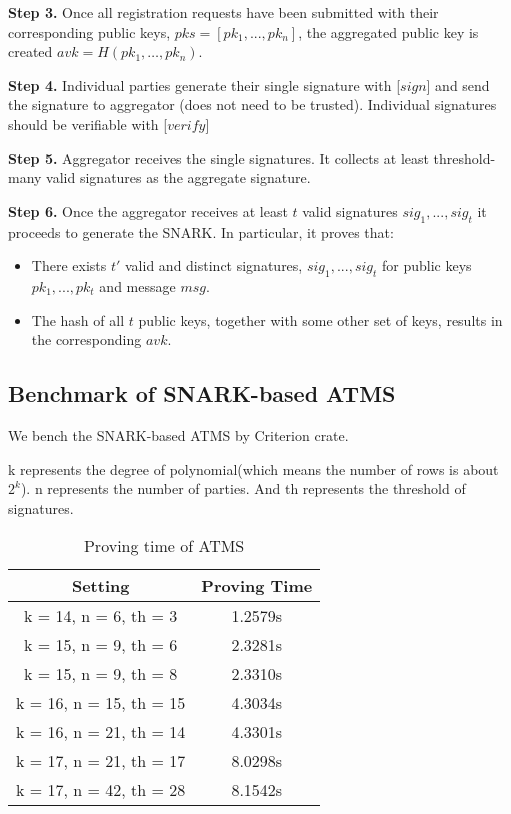 \documentclass{article}
\begin{document}
  
\textbf{Step 3.} Once all registration requests have been submitted with their corresponding public keys, $pks = [pk_1, ..., pk_n]$, the aggregated public key is created $avk = H(pk_1, \ldots, pk_n)$.

\textbf{Step 4.} Individual parties generate their single signature with [$sign$] and send the signature to aggregator (does not need to be trusted).
Individual signatures should be verifiable with [$verify$]

\textbf{Step 5.} Aggregator receives the single signatures. It collects at least threshold-many valid signatures as the aggregate signature.

\textbf{Step 6.} Once the aggregator receives at least $t$ valid signatures $sig_1, ..., sig_t$ it proceeds to generate the SNARK. In particular, it proves that:

\begin{itemize}
    \item There exists $t'$ valid and distinct signatures, $sig_1, ..., sig_t$ for public keys $pk_1, ..., pk_t$ and message $msg$.
    \item The hash of all $t$ public keys, together with some other set of keys, results in the corresponding $avk$.
\end{itemize}












\subsection{Benchmark of SNARK-based ATMS}



We bench the SNARK-based ATMS by Criterion crate.

k represents the degree of polynomial(which means the number of rows is about $2^k$). n represents the number of parties. And th represents the threshold of signatures.


\begin{table}[H]
    \centering
    \begin{tabular}{c|c} \hline
        Setting & Proving Time \\ \hline
         k = 14, n = 6, th = 3& 1.2579s  \\ \hline
         k = 15, n = 9, th = 6& 2.3281s \\ \hline
         k = 15, n = 9, th = 8& 2.3310s \\ \hline
         k = 16, n = 15, th = 15& 4.3034s \\ \hline
         k = 16, n = 21, th = 14& 4.3301s \\ \hline
         k = 17, n = 21, th = 17& 8.0298s \\ \hline
         k = 17, n = 42, th = 28& 8.1542s \\ \hline
    \end{tabular}
    \caption{Proving time of ATMS}
    \label{tab:my_label}
\end{table}
\end{document}
